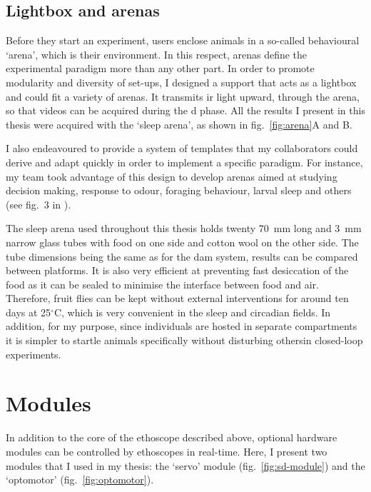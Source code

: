 \subsection{Lightbox and arenas}
Before they start an experiment, users enclose animals in a so-called behavioural `arena',
which is their environment.
In this respect, arenas define the experimental paradigm more than any other part.
In order to promote modularity and diversity of set-ups, I designed a support that acts as a lightbox and could fit a variety of arenas.
It transmits \gls{ir} light upward, through the arena, so that videos can be acquired during the \gls{d} phase.
All the results I present in this thesis were acquired with the `sleep arena', as shown in fig.~\ref{fig:arena}A and B. 



I also endeavoured to provide a system of templates that my collaborators could derive and adapt quickly in order to implement a specific paradigm. 
For instance, my team took advantage of this design to develop arenas aimed at studying decision making, response to odour, foraging behaviour, larval sleep and others (see fig.~3 in \cite{geissmann_ethoscopes_2017}).

The sleep arena used throughout this thesis holds twenty 70~mm long and 3~mm narrow glass tubes with food on one side and cotton wool on the other side.
The tube dimensions being the same as for the \gls{dam} system, results can be compared between platforms.
It is also very efficient at preventing fast desiccation of the food as it can be sealed to minimise the interface between food and air.
Therefore, fruit flies can be kept without external interventions for around ten days at 25$^{\circ}$C,
which is very convenient in the sleep and circadian fields.
In addition, for my purpose, since individuals are hosted in separate compartments it is simpler to startle animals specifically\emd{}\ie{} without disturbing others\emd{}in closed-loop experiments.

\section{Modules}

In addition to the core of the ethoscope described above, optional hardware modules can be controlled by ethoscopes in real-time.
Here, I present two modules that I used in my thesis: the `servo' module (fig.~\ref{fig:sd-module}) and the `optomotor' (fig.~\ref{fig:optomotor}).

